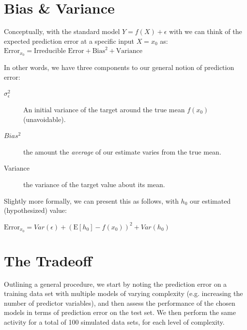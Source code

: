 \documentclass[english,nohyper,titlepage]{tufte-handout}
\begin{document}
\section{Bias \& Variance}
Conceptually, with the standard model $Y = f(X) + \epsilon$ with we can think of the expected prediction error at a specific input $X = x_0$ as: \\

\vspace{.25cm}
\noindent $\text{Error}_{x_0} = \text{Irreducible Error} + \text{Bias}^2 + \text{Variance}$
\vspace{.25cm}

In other words, we have three components to our general notion of prediction error: \\

\begin{description}
  \item[$\sigma^2_\epsilon$] An initial variance of the target around the true mean $f(x_0)$ (unavoidable).
  \item[$Bias^2$] the amount the \emph{average} of our estimate varies from the true mean.
  \item[Variance] the variance of the target value about its mean.
\end{description}

Slightly more formally, we can present this as follows, with $h_0$ our estimated (hypothesized) value:

\vspace{.25cm}
\noindent $\text{Error}_{x_0} = Var(\epsilon) + (\text{E}[h_0] - f(x_0))^2 + Var(h_0) $
\vspace{.25cm}


\section{The Tradeoff}
Outlining a general procedure, we start by noting the prediction error on a training data set with multiple models of varying complexity (e.g. increasing the number of predictor variables), and then assess the performance of the chosen models in terms of prediction error on the test set.  We then perform the same activity for a total of 100 simulated data sets, for each level of complexity.
\end{document}
